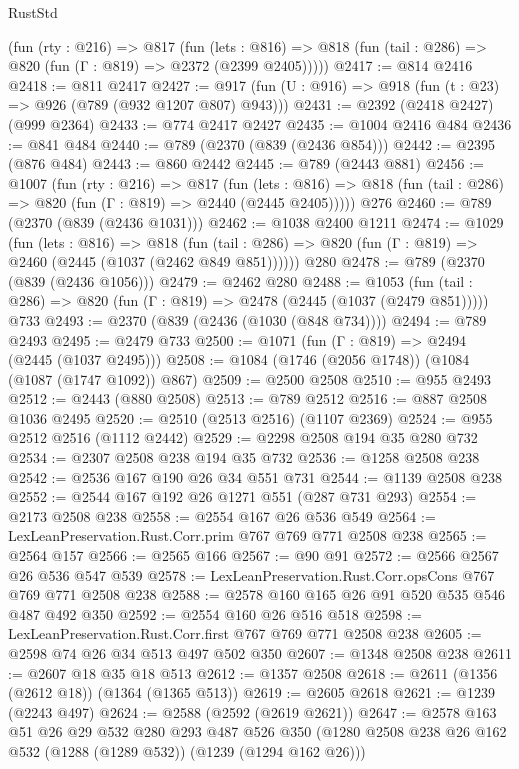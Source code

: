 \begin{lexlean}{RustStd}
\begin{coremodule}
    (fun (rty : @216) =>
    @817
      (fun (lets : @816) =>
      @818 (fun (tail : @286) => @820 (fun (Γ : @819) => @2372 (@2399 @2405)))))
@2417 := @814 @2416
@2418 := @811 @2417
@2427 := @917 (fun (U : @916) => @918 (fun (t : @23) => @926 (@789 (@932 @1207 @807) @943)))
@2431 := @2392 (@2418 @2427) (@999 @2364)
@2433 := @774 @2417 @2427
@2435 := @1004 @2416 @484
@2436 := @841 @484
@2440 := @789 (@2370 (@839 (@2436 @854)))
@2442 := @2395 (@876 @484)
@2443 := @860 @2442
@2445 := @789 (@2443 @881)
@2456 := @1007
    (fun (rty : @216) =>
    @817
      (fun (lets : @816) =>
      @818 (fun (tail : @286) => @820 (fun (Γ : @819) => @2440 (@2445 @2405)))))
    @276
@2460 := @789 (@2370 (@839 (@2436 @1031)))
@2462 := @1038 @2400 @1211
@2474 := @1029
    (fun (lets : @816) =>
    @818 (fun (tail : @286) => @820 (fun (Γ : @819) => @2460 (@2445 (@1037 (@2462 @849 @851))))))
    @280
@2478 := @789 (@2370 (@839 (@2436 @1056)))
@2479 := @2462 @280
@2488 := @1053
    (fun (tail : @286) => @820 (fun (Γ : @819) => @2478 (@2445 (@1037 (@2479 @851)))))
    @733
@2493 := @2370 (@839 (@2436 (@1030 (@848 @734))))
@2494 := @789 @2493
@2495 := @2479 @733
@2500 := @1071 (fun (Γ : @819) => @2494 (@2445 (@1037 @2495)))
@2508 := @1084 (@1746 (@2056 @1748)) (@1084 (@1087 (@1747 @1092)) @867)
@2509 := @2500 @2508
@2510 := @955 @2493
@2512 := @2443 (@880 @2508)
@2513 := @789 @2512
@2516 := @887 @2508 @1036 @2495
@2520 := @2510 (@2513 @2516) (@1107 @2369)
@2524 := @955 @2512 @2516 (@1112 @2442)
@2529 := @2298 @2508 @194 @35 @280 @732
@2534 := @2307 @2508 @238 @194 @35 @732
@2536 := @1258 @2508 @238
@2542 := @2536 @167 @190 @26 @34 @551 @731
@2544 := @1139 @2508 @238
@2552 := @2544 @167 @192 @26 @1271 @551 (@287 @731 @293)
@2554 := @2173 @2508 @238
@2558 := @2554 @167 @26 @536 @549
@2564 := LexLeanPreservation.Rust.Corr.prim @767 @769 @771 @2508 @238
@2565 := @2564 @157
@2566 := @2565 @166
@2567 := @90 @91
@2572 := @2566 @2567 @26 @536 @547 @539
@2578 := LexLeanPreservation.Rust.Corr.opsCons @767 @769 @771 @2508 @238
@2588 := @2578 @160 @165 @26 @91 @520 @535 @546 @487 @492 @350
@2592 := @2554 @160 @26 @516 @518
@2598 := LexLeanPreservation.Rust.Corr.first @767 @769 @771 @2508 @238
@2605 := @2598 @74 @26 @34 @513 @497 @502 @350
@2607 := @1348 @2508 @238
@2611 := @2607 @18 @35 @18 @513
@2612 := @1357 @2508
@2618 := @2611 (@1356 (@2612 @18)) (@1364 (@1365 @513))
@2619 := @2605 @2618
@2621 := @1239 (@2243 @497)
@2624 := @2588 (@2592 (@2619 @2621))
@2647 := @2578
    @163
    @51
    @26
    @29
    @532
    @280
    @293
    @487
    @526
    @350
    (@1280 @2508 @238 @26 @162 @532 (@1288 (@1289 @532)) (@1239 (@1294 @162 @26)))

\end{coremodule}
\end{lexlean}
